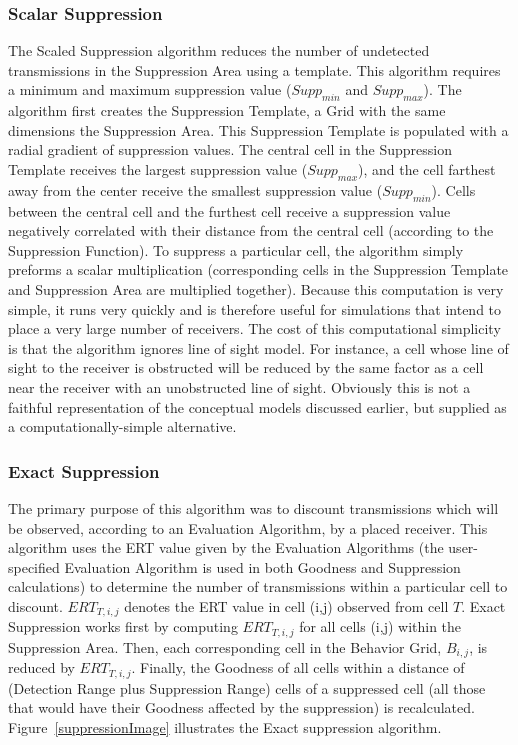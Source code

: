 \subsubsection{Scalar Suppression}
\label{scaledSuppression}
The Scaled Suppression algorithm reduces the number of undetected transmissions in the Suppression Area using a template.  This algorithm requires a minimum and maximum suppression value ($Supp_{min}$ and $Supp_{max}$).  The algorithm first creates the Suppression Template, a Grid with the same dimensions the Suppression Area.  This Suppression Template is populated with a radial gradient of suppression values.  The central cell in the Suppression Template receives the largest suppression value ($Supp_{max}$), and the cell farthest away from the center receive the smallest suppression value ($Supp_{min}$). Cells between the central cell and the furthest cell receive a suppression value negatively correlated with their distance from the central cell (according to the Suppression Function).  To suppress a particular cell, the  algorithm simply preforms a scalar multiplication (corresponding cells in the Suppression Template and Suppression Area are multiplied together).  Because this computation is very simple, it runs very quickly and is therefore useful for simulations that intend to place a very large number of receivers.  The cost of this computational simplicity is that the algorithm ignores line of sight model.  For instance, a cell whose line of sight to the receiver is obstructed will be reduced by the same factor as a cell near the receiver with an unobstructed line of sight.  Obviously this is not a faithful representation of the conceptual models discussed earlier, but supplied as a computationally-simple alternative.

\subsubsection{Exact Suppression}
\label{exactSuppression}
The primary purpose of this algorithm was to discount transmissions which will be observed, according to an Evaluation Algorithm, by a placed receiver.  This algorithm uses the ERT value given by the Evaluation Algorithms (the user-specified Evaluation Algorithm is used in both Goodness and Suppression calculations) to determine the number of transmissions within a particular cell to discount.  $ERT_{T,i,j}$ denotes the ERT value in cell (i,j) observed from cell $T$.  Exact Suppression works first by computing $ERT_{T,i,j}$ for all cells (i,j)  within the Suppression Area.  Then, each corresponding cell in the Behavior Grid, $B_{i,j}$, is reduced by $ERT_{T,i,j}$.  Finally, the Goodness of all cells within a distance of (Detection Range plus Suppression Range) cells of a suppressed cell (all those that would have their Goodness affected by the suppression) is recalculated.  Figure~\ref{suppressionImage} illustrates the Exact suppression algorithm.  

